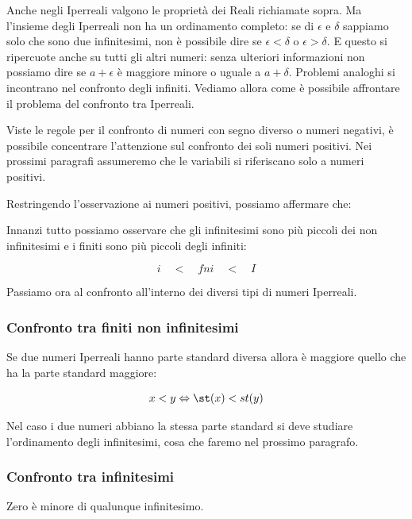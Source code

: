 Anche negli Iperreali valgono le proprietà dei Reali richiamate sopra. 
Ma l'insieme degli Iperreali non ha un ordinamento completo:
se di $\epsilon$ e $\delta$ sappiamo solo che sono due infinitesimi,
non è possibile dire se $\epsilon < \delta$ o $\epsilon > \delta$.
E questo si ripercuote anche su tutti gli altri numeri: senza ulteriori 
informazioni non possiamo dire se $a+\epsilon$ è maggiore minore o uguale 
a $a+\delta$. 
Problemi analoghi si incontrano nel confronto degli infiniti.
Vediamo allora come è possibile affrontare il problema del confronto tra 
Iperreali.

\begin{osservazione}
Viste le regole per il confronto di numeri con segno diverso o numeri 
negativi, 
è possibile concentrare l'attenzione sul confronto dei soli numeri positivi.
Nei prossimi paragrafi assumeremo che le variabili si riferiscano solo a numeri 
positivi.
\end{osservazione}

Restringendo l'osservazione ai numeri positivi, possiamo affermare che:

Innanzi tutto possiamo osservare che gli infinitesimi sono più piccoli dei non 
infinitesimi e i finiti sono più piccoli degli infiniti:

\[i \quad < \quad fni \quad < \quad I\]

Passiamo ora al confronto all'interno dei diversi tipi di numeri Iperreali.

\subsubsection{Confronto tra finiti non infinitesimi}
\label{subsubsec:insnum_confrontoreali}

Se due numeri Iperreali hanno parte standard diversa allora è maggiore quello 
che ha la parte standard maggiore:

\[x < y \Leftrightarrow \st(x) < st(y)\]

Nel caso i due numeri abbiano la stessa parte standard si deve studiare 
l'ordinamento degli infinitesimi, cosa che faremo nel prossimo paragrafo.

\subsubsection{Confronto tra infinitesimi}
\label{subsubsec:insnum_confrontoreali}

Zero è minore di qualunque infinitesimo.

